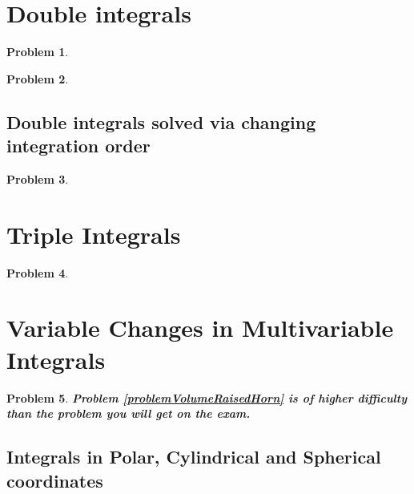 \documentclass{article}
\newtheorem{problem}{Problem}
\begin{document}
\section{Double integrals}

\begin{problem}

\end{problem}

\begin{problem}

\end{problem}

\subsection{Double integrals solved via changing integration order}

\begin{problem}

\end{problem}

\section{Triple Integrals}
\begin{problem}

\end{problem}


\section{Variable Changes in Multivariable Integrals}
\begin{problem}
\textbf{Problem \ref{problemVolumeRaisedHorn} is of higher difficulty than the problem you will get on the exam.}


\end{problem}


\subsection{Integrals in Polar, Cylindrical and Spherical coordinates}
\end{document}
